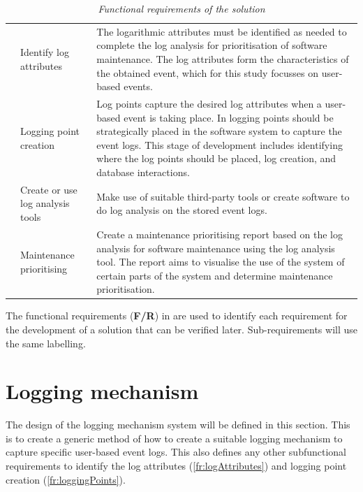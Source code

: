 \setcounter{phase}{0}
\begin{table}[!htb]
	\centering
	\caption[Functional requirements of the solution]
	{\textit{Functional requirements of the solution}}
	\label{tbl:ch2_developmenetRequirements}
	\begin{tabularx}{\textwidth}{llX}
		\toprule
		\thead{Requirement ID} & \thead{Name} & \thead{Description} \\
		\midrule

		\rowcolor{lightgray}
		\phase{fr:logAttributes} & Identify log attributes & \RaggedRight The logarithmic attributes must be identified as needed to complete the log analysis for prioritisation of software maintenance. The log attributes form the characteristics of the obtained event, which for this study focusses on user-based events. \\

		\phase{fr:loggingPoints} & Logging point creation & \RaggedRight Log points capture the desired log attributes when a user-based event is taking place. In \Cref{sec:ch1_loggignPoints} logging points should be strategically placed in the software system to capture the event logs. This stage of development includes identifying where the log points should be placed, log creation, and database interactions. \\

		\rowcolor{lightgray}
		\phase{fr:logAnalysis} & \RaggedRight Create or use log analysis tools & Make use of suitable third-party tools or create software to do log analysis on the stored event logs. \\

		\phase{fr:maintenancePrioritising} & \RaggedRight Maintenance prioritising & Create a maintenance prioritising report based on the log analysis for software maintenance using the log analysis tool. The report aims to visualise the use of the system of certain parts of the system and determine maintenance prioritisation.\\
		\bottomrule
	\end{tabularx}
\end{table}

The functional requirements (\textbf{F/R}) in  are used to identify each requirement for the development of a solution that can be verified later. Sub-requirements will use the same labelling. 

\section{Logging mechanism}\label{sec:ch2_loggingMechanism}
The design of the logging mechanism system will be defined in this section. This is to create a generic method of how to create a suitable logging mechanism to capture specific user-based event logs. This also defines any other subfunctional requirements to identify the log attributes (\ref{fr:logAttributes}) and logging point creation (\ref{fr:loggingPoints}).

